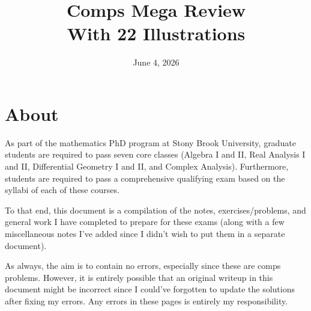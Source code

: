 \documentclass{article}
\title{Comps Mega Review \\ \normalsize{With 22 Illustrations} \vspace{-0.5cm}}
\author{\me}
\date{June 4, 2026}
\begin{document}
	\maketitle
	\fullline 
	\tableofcontents 
	\halfline 
	\newpage 
	\section{About}
	As part of the mathematics PhD program at Stony Brook University, graduate students are required to pass seven core classes (Algebra I and II, Real Analysis I and II, Differential Geometry I and II, and Complex Analysis). Furthermore, students are required to pass a comprehensive qualifying exam based on the syllabi of each of these courses.
	
	To that end, this document is a compilation of the notes, exercises/problems, and general work I have completed to prepare for these exams (along with a few miscellaneous notes I've added since I didn't wish to put them in a separate document).
	
	As always, the aim is to contain no errors, especially since these are comps problems. However, it is entirely possible that an original writeup in this document might be incorrect since I could've forgotten to update the solutions after fixing my errors. Any errors in these pages is entirely my responsibility. 
\end{document}
